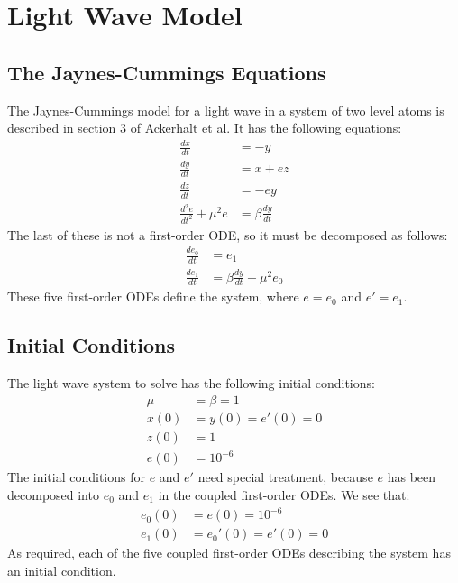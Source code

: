 \documentclass[12pt]{article}
\begin{document}
\section{Light Wave Model}
\subsection{The Jaynes-Cummings Equations}
The Jaynes-Cummings model for a light wave in a system of two level atoms is described in section 3 of Ackerhalt\cite{ackerhalt} et al. It has the following equations:
\begin{align*}
\frac{dx}{dt} &= -y \\
\frac{dy}{dt} &= x + ez \\
\frac{dz}{dt} &= -ey \\
\frac{d^2e}{dt^2} + \mu^2e &= \beta \frac{dy}{dt}
\end{align*}
The last of these is not a first-order ODE, so it must be decomposed as follows:
\begin{align*}
\frac{de_0}{dt} &= e_1 \\
\frac{de_1}{dt} &= \beta \frac{dy}{dt} - \mu^2e_0
\end{align*}
These five first-order ODEs define the system, where $e = e_0$ and $e' = e_1$.
\subsection{Initial Conditions}
The light wave system to solve has the following initial conditions:
\begin{align*}
\mu &= \beta = 1 \\
x(0) &= y(0) = e'(0) = 0 \\
z(0) &= 1 \\
e(0) &= 10^{- 6}
\end{align*}
The initial conditions for $e$ and $e'$ need special treatment, because $e$ has been decomposed into $e_0$ and $e_1$ in the coupled first-order ODEs. We see that:
\begin{align*}
e_0(0) &= e(0) = 10^{- 6} \\
e_1(0) &= e_0'(0) = e'(0) = 0
\end{align*}
As required, each of the five coupled first-order ODEs describing the system has an initial condition.
\end{document}
